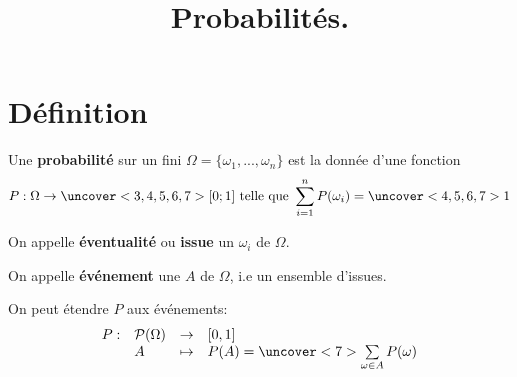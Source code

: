 \documentclass{beamer}
\date{}
\title{Probabilités.}
\begin{document}
  
  \begin{frame}
    
    \titlepage
    
  \end{frame}
  
  \section{Définition}
 
  \begin{frame}
  
  \begin{definition}
  Une \textbf{probabilité} sur un  fini 
  $\Omega=\lbrace \omega_1,...,\omega_n \rbrace$ est la donnée
  d'une fonction $$P:\Omega \to \uncover<3,4,5,6,7>{[0;1]} \textrm{ telle que }
  \sum_{i=1}^n P(\omega_i)=\uncover<4,5,6,7>{1}$$
  
  On appelle \textbf{éventualité} ou \textbf{issue} un  
  $\omega_i$ de $\Omega$.
  
  On appelle \textbf{événement} une  $A$ de $\Omega$, i.e un ensemble d'issues.
  
  On peut étendre $P$ aux événements:
  $$
  \begin{array}{llll}
		P:&\mathcal{P}(\Omega) &\to& [0,1] \\
		  &A                   & \mapsto &
		  P(A)=\uncover<7>{\sum\limits_{\omega \in A} P(\omega)}\\
  \end{array}
  $$
   
  \end{definition}
  
  \end{frame}
  
\end{document}
